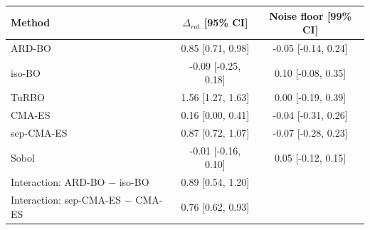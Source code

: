 \begin{tabular}{lcc}
\toprule
Method & $\Delta_{rot}$ [95\% CI] & Noise floor [99\% CI] \\
\midrule
ARD-BO & 0.85 [0.71, 0.98] & -0.05 [-0.14, 0.24] \\
iso-BO & -0.09 [-0.25, 0.18] & 0.10 [-0.08, 0.35] \\
TuRBO & 1.56 [1.27, 1.63] & 0.00 [-0.19, 0.39] \\
CMA-ES & 0.16 [0.00, 0.41] & -0.04 [-0.31, 0.26] \\
sep-CMA-ES & 0.87 [0.72, 1.07] & -0.07 [-0.28, 0.23] \\
Sobol & -0.01 [-0.16, 0.10] & 0.05 [-0.12, 0.15] \\
Interaction: ARD-BO $-$ iso-BO & 0.89 [0.54, 1.20] &  \\
Interaction: sep-CMA-ES $-$ CMA-ES & 0.76 [0.62, 0.93] &  \\
\bottomrule
\end{tabular}
